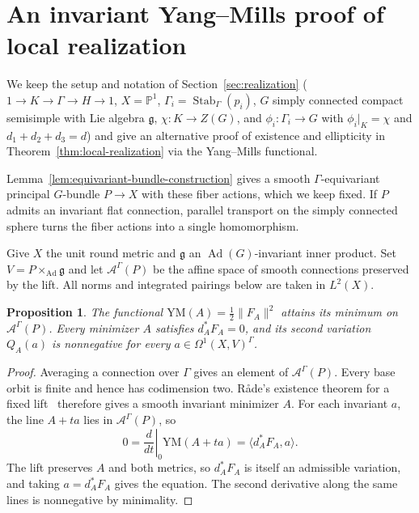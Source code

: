 \documentclass[11pt,a4paper,reqno]{amsart}
\theoremstyle{plain}
\newtheorem{proposition}[theorem]{Proposition}
\theoremstyle{definition}
\theoremstyle{remark}
\numberwithin{equation}{section}
\DeclareMathOperator{\Stab}{Stab}
\DeclareMathOperator{\Ad}{Ad}
\newcommand{\PP}{\mathbb P}
\newcommand{\fg}{\mathfrak g}
\begin{document}
\section{An invariant Yang--Mills proof of local realization}\label{app:yang-mills}

We keep the setup and notation of Section~\ref{sec:realization} ($1\to K\to\Gamma\to H\to1$, $X=\PP^1$, $\Gamma_i=\Stab_\Gamma(p_i)$, $G$ simply connected compact semisimple with Lie algebra $\fg$, $\chi\colon K\to Z(G)$, and $\phi_i\colon\Gamma_i\to G$ with $\phi_i|_K=\chi$ and $d_1+d_2+d_3=d$) and give an alternative proof of existence and ellipticity in Theorem~\ref{thm:local-realization} via the Yang--Mills functional.

Lemma~\ref{lem:equivariant-bundle-construction} gives a smooth $\Gamma$-equivariant principal $G$-bundle $P\to X$ with these fiber actions, which we keep fixed. If $P$ admits an invariant flat connection, parallel transport on the simply connected sphere turns the fiber actions into a single homomorphism.

Give $X$ the unit round metric and $\fg$ an $\Ad(G)$-invariant inner product. Set $V=P\times_{\Ad}\fg$ and let $\mathcal A^\Gamma(P)$ be the affine space of smooth connections preserved by the lift. All norms and integrated pairings below are taken in $L^2(X)$.

\begin{proposition}\label{prop:app-ym-minimum}
The functional $\mathrm{YM}(A)=\tfrac12\|F_A\|^2$ attains its minimum on $\mathcal A^\Gamma(P)$. Every minimizer $A$ satisfies $d_A^*F_A=0$, and its second variation $Q_A(a)$ is nonnegative for every $a\in\Omega^1(X,V)^\Gamma$.
\end{proposition}

\begin{proof}
Averaging a connection over $\Gamma$ gives an element of $\mathcal A^\Gamma(P)$. Every base orbit is finite and hence has codimension two. R{\aa}de's existence theorem for a fixed lift~\cite[Corollary~1]{RadeInvariant} therefore gives a smooth invariant minimizer $A$. For each invariant $a$, the line $A+ta$ lies in $\mathcal A^\Gamma(P)$, so
\[
0=\left.\frac{d}{dt}\right|_{0}\mathrm{YM}(A+ta)   =\langle d_A^*F_A,a\rangle.
\]
The lift preserves $A$ and both metrics, so $d_A^*F_A$ is itself an admissible variation, and taking $a=d_A^*F_A$ gives the equation. The second derivative along the same lines is nonnegative by minimality.
\end{proof}
\end{document}

